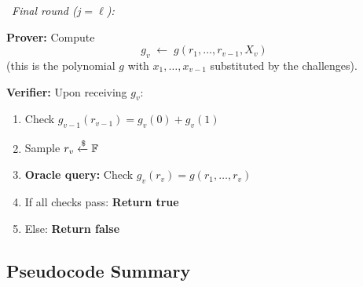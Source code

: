 \documentclass[11pt]{article}
\begin{document}
\begin{tcolorbox}[colback=gray!5, colframe=gray!50, title={Sumcheck Protocol (full description)}]
\begin{center}
\end{center}

\bigskip
\dotfill\ \textit{Final round ($j = \ell$):} \dotfill

\bigskip
\textbf{Prover:} Compute
\[
  g_v \;\leftarrow\; g(r_1, \ldots, r_{v-1}, X_v)
\]
(this is the polynomial $g$ with $x_1,\ldots,x_{v-1}$ substituted by the challenges).

\textbf{Verifier:} Upon receiving $g_v$:
\begin{enumerate}
  \item Check $g_{v-1}(r_{v-1}) = g_v(0) + g_v(1)$
  \item Sample $r_v \xleftarrow{\$} \mathbb{F}$
  \item \textbf{Oracle query:} Check $g_v(r_v) = g(r_1, \ldots, r_v)$
  \item If all checks pass: \textbf{Return true}
  \item Else: \textbf{Return false}
\end{enumerate}
\end{tcolorbox}

\subsection{Pseudocode Summary}
\end{document}
